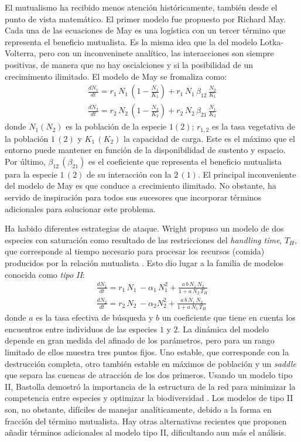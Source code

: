 El mutualismo ha recibido menos atención históricamente, también desde el punto de vista matemático. El primer modelo fue propuesto por Richard May. Cada una de las ecuaciones de May es una logística con un tercer término que representa el beneficio mutualista. Es la misma idea que la del modelo Lotka-Volterra, pero con un inconveninete analítico, las interacciones son siempre positivas, de manera que no hay oscialciones y si la posibilidad de un crecimimento ilimitado. El modelo de May se fromaliza como:
\begin{align}
\frac{dN_1}{dt}=r_1 \,N_1\,\left(1-\frac{N_1}{K_1}\right)+r_1\, N_1\,\beta_{12}\, \frac{N_2}{K_1} \nonumber \\ 
\frac{dN_2}{dt}=r_2\, N_2\, \left(1-\frac{N_2}{K_2}\right)+r_2\, N_2\, \beta_{21} \, \frac{N_1}{K_2} 
\label{myeq2}
\end{align}
\noindent donde $N_1(N_2)$ es la población de la especie $1(2)$; $r_{1,2}$ es la tasa vegetativa de la población $1\, (2)$ y $K_1\, (K_2)$ la capacidad de carga. Este es el máximo que el entorno puede mantener en función de la disponibilidad de sustento y espacio. Por último, $\beta_{12}\,(\beta_{21})$ es el coeficiente que representa el beneficio mutualista para la especie $1\,(2)$ de su interacción con la $2\,(1)$. El principal inconveniente del modelo de May es que conduce a crecimiento ilimitado. No obstante, ha servido de inspiración para todos sus sucesores que incorporar términos adicionales para solucionar este problema.

Ha habido diferentes estrategias de ataque. Wright propuso un modelo de dos especies con saturación como resultado de las restricciones del \textit{handling time}, $T_H$, que corresponde al tiempo necesario para procesar los recursos (comida) producidos por la relación mutualista \cite{wright1989}. Esto dio lugar a la familia de modelos conocida como \textit{tipo II}:
\begin{align}
\frac{dN_1}{dt}=r_1\, N_1\, - \alpha_1 \, N_1^2+ \frac{a\, b\, N_1\,N_2}{1+ a\, N_2\,T_H} \nonumber\\
\frac{dN_2}{dt}=r_2\, N_2\, - \alpha_2 N_2^2 + \frac{a\,b\,N_1\,N_2}{1+a\, N_1\, T_H}
\label{eq_typeII}
\end{align}
\noindent donde $a$ es la tasa efectiva de búsqueda y $b$ un coeficiente que tiene en cuenta los encuentros entre individuos de las especies $1$ y $2$. La dinámica del modelo depende en gran medida del afinado de los parámetros, pero para un rango limitado de ellos muestra tres puntos fijos. Uno estable, que corresponde con la destrucción completa, otro también estable en máximos de población y un \textit{saddle} que separa las cuencas de atracción de los dos primeros. Usando un modelo tipo II, Bastolla demostró la importancia de la estructura de la red para minimizar la competencia entre especies y optimizar la biodiversidad \cite{bastolla2005,bastolla2009}. Los modelos de tipo II son, no obstante, difíciles de manejar analíticamente, debido a la forma en fracción del término mutualista. Hay otras alternativas recientes \cite{johnson2013} que proponen añadir términos adicionales al modelo tipo II, dificultando aun más el análisis.

